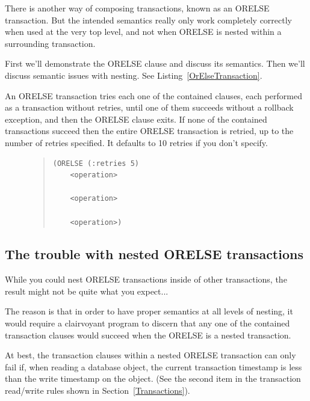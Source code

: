 \documentclass[article,oneside]{memoir}
\begin{document}
There is another way of composing transactions, known as an {\ttfamily ORELSE} transaction. But the intended semantics really only work completely correctly when used at the very top level, and not when {\ttfamily ORELSE} is nested within a surrounding transaction. 


First we'll demonstrate the {\ttfamily ORELSE} clause and discuss its semantics. Then we'll discuss semantic issues with nesting. See Listing~\ref{OrElseTransaction}. 


An {\ttfamily ORELSE} transaction tries each one of the contained clauses, each performed as a transaction without retries, until one of them succeeds without a rollback exception, and then the {\ttfamily ORELSE} clause exits. If none of the contained transactions succeed then the entire {\ttfamily ORELSE} transaction is retried, up to the number of retries specified. It defaults to 10 retries if you don't specify.

\begin{figure}[!htbp]
\begin{quote}
\begin{lstlisting}
(ORELSE (:retries 5)
	<operation>

	<operation>

	<operation>)
\end{lstlisting}
\end{quote}
\end{figure}

\subsection{The trouble with nested {\ttfamily ORELSE} transactions}
While you could nest {\ttfamily ORELSE} transactions inside of other transactions, the result might not be quite what you expect... 

The reason is that in order to have proper semantics at all levels of nesting, it would require a clairvoyant program to discern that any one of the contained transaction clauses would succeed when the {\ttfamily ORELSE} is a nested transaction. 

At best, the transaction clauses within a nested {\ttfamily ORELSE} transaction can only fail if, when reading a database object, the current transaction timestamp is less than the write timestamp on the object. (See the second item in the transaction read/write rules shown in Section~\ref{Transactions}).
\end{document}
